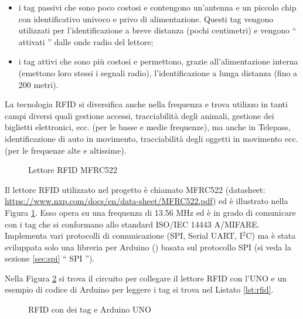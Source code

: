\documentclass[12pt]{report}
\begin{document}
\begin{itemize}
	\item i tag passivi che sono poco costosi e contengono un'antenna e un piccolo chip con identificativo univoco e privo di alimentazione. Questi tag vengono utilizzati per l'identificazione a breve distanza (pochi centimetri) e vengono \textquotedblleft{} attivati \textquotedblright{} dalle onde radio del lettore;
	\item i tag attivi che sono più costosi e permettono, grazie all'alimentazione interna (emettono loro stessi i segnali radio), l'identificazione a lunga distanza (fino a 200 metri).
\end{itemize}

La tecnologia RFID si diversifica anche nella frequenza e trova utilizzo in tanti campi diversi quali gestione accessi, tracciabilità degli animali, gestione dei biglietti elettronici, ecc$.$ (per le basse e medie frequenze), ma anche in Telepass, identificazione di auto in movimento, tracciabilità degli oggetti in movimento ecc. (per le frequenze alte e altissime).

\begin{figure}
	\caption{Lettore RFID MFRC522}
	\label{fig:mfrc522}
\end{figure}

Il lettore RFID utilizzato nel progetto è chiamato MFRC522 (datasheet: \url{https://www.nxp.com/docs/en/data-sheet/MFRC522.pdf}) ed è illustrato nella Figura \ref{fig:mfrc522}. Esso opera su una frequenza di 13.56 MHz ed è in grado di comunicare con i tag che si conformano allo standard ISO/IEC 14443 A/MIFARE. Implementa vari protocolli di comunicazione (SPI, Serial UART, I$^2$C) ma è stata sviluppata solo una libreria per Arduino (\cite{rfid_lib}) basata sul protocollo SPI (si veda la sezione \ref{sec:spi} \textquotedblleft{} SPI \textquotedblright{}).

Nella Figura \ref{fig:rfid_uno} si trova il circuito per collegare il lettore RFID con l'UNO e un esempio di codice di Arduino per leggere i tag si trova nel Listato \ref{lst:rfid}.

\begin{figure}[H]
	\caption{RFID con dei tag e Arduino UNO}
	\label{fig:rfid_uno}
\end{figure}
\end{document}
